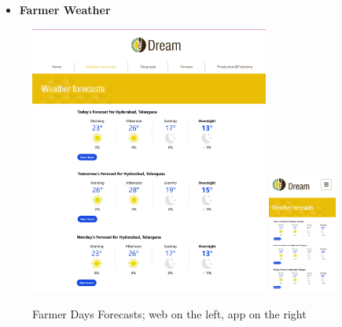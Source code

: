 \documentclass{article}
\begin{document}
    \begin{itemize}
        \item \textbf{Farmer Weather}
    \end{itemize}
        \begin{figure} [h]
            \centering
            \includegraphics[width=0.7\textwidth]{images/UserInterfaces/Farmer/Weather/DaysForecastWeb.png}
            \quad
            \includegraphics[width=0.2\textwidth]{images/UserInterfaces/Farmer/Weather/DaysForecastApp.png}
            \quad
            \caption{\label{fig:farmerWeatherDay}Farmer Days Forecasts; web on the left, app on the right}
        \end{figure}
        \newpage
\end{document}
